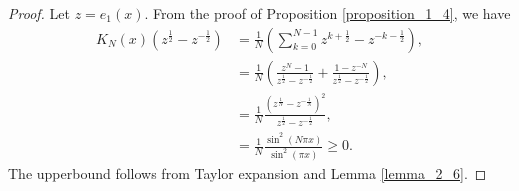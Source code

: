 \documentclass[8pt]{article}
\begin{document}
\begin{proof}
  Let $z = e_1(x)$. From the proof of Proposition \ref{proposition_1_4}, we have
  \begin{align*}
    K_N(x)(z^{{\frac 1 2}}-z^{-{\frac 1 2}}) & = {\frac 1 N}\left(\sum_{k=0}^{N-1}z^{k+{\frac 1 2}}-z^{-k-{\frac 1 2}}\right),\\
    & = {\frac 1 N}\left({\frac {z^N-1} {z^{{\frac 1 2}}-z^{-{\frac 1 2}}}}+{\frac {1-z^{-N}} {z^{{\frac 1 2}}-z^{-{\frac 1 2}}}}\right),\\
    & = {\frac 1 N}{\frac {(z^{{\frac 1 N}}-z^{-{\frac 1 N}})^2} {z^{{\frac 1 2}}-z^{-{\frac 1 2}}}},\\
    & = {\frac 1 N}{\frac {\sin^2 (N\pi x)} {\sin^2(\pi x)}}\geq0.
  \end{align*}
  The upperbound follows from Taylor expansion and Lemma \ref{lemma_2_6}.
\end{proof}
\end{document}
